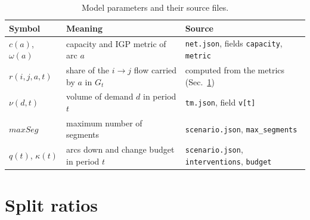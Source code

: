 \documentclass[11pt,a4paper]{article}
\newcommand{\maxseg}{\mathit{maxSeg}}
\begin{document}
\begin{table}[tbp]
\centering\small
\caption{Model parameters and their source files.}\label{tab:data}
\begin{tabular}{@{}lll@{}}
\toprule
Symbol & Meaning & Source \\
\midrule
$c(a)$, $\omega(a)$ & capacity and IGP metric of arc $a$ & \texttt{net.json}, fields \texttt{capacity}, \texttt{metric}\\
$r(i,j,a,t)$ & share of the $i\to j$ flow carried by $a$ in $G_t$ & computed from the metrics (Sec.~\ref{sec:ratios})\\
$\nu(d,t)$ & volume of demand $d$ in period $t$ & \texttt{tm.json}, field \texttt{v[t]}\\
$\maxseg$ & maximum number of segments & \texttt{scenario.json}, \texttt{max\_segments}\\
$q(t)$, $\kappa(t)$ & arcs down and change budget in period $t$ & \texttt{scenario.json}, \texttt{interventions}, \texttt{budget}\\
\bottomrule
\end{tabular}
\end{table}

\section{Split ratios}\label{sec:ratios}
\end{document}
